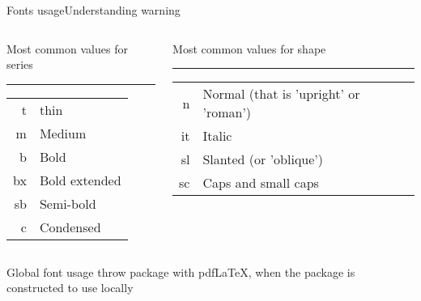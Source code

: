 \begin{frame}[fragile]{Fonts usage\magicPage}{Understanding warning}\relax
\centering
\begin{columns}[t]
\begin{column}{0.5\textwidth}
\centering

Most common values for series\strut\hrule

\begin{tabular}{rl}
     t & thin\\
     m &Medium\\ 
     b &Bold \\
     bx & Bold extended\\ 
     sb &Semi-bold\\ 
     c & Condensed
\end{tabular}
\end{column}

\begin{column}{0.5\textwidth}

Most common values for shape\strut\hrule

\begin{tabular}{rl}
n & Normal \scriptsize(that is 'upright' or 'roman') \\ 
it & Italic\\  
sl & Slanted \scriptsize(or 'oblique') \\ 
sc &Caps and small caps
\end{tabular}
\end{column}
     
\end{columns}
\cprotect{}
\end{frame}

\begin{frame}
\magicPage
     \centering\huge Global font usage throw package with pdf\LaTeX, when the package is constructed to use locally
     
\end{frame}

